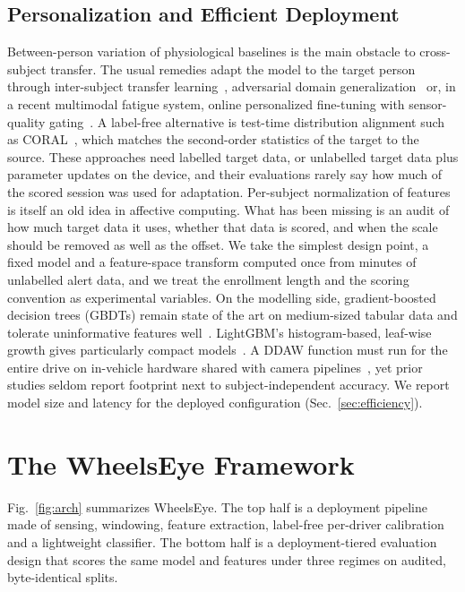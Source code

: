\documentclass[journal]{IEEEtran}
\newcommand{\sysname}{WheelsEye}
\begin{document}
\subsection{Personalization and Efficient Deployment}
Between-person variation of physiological baselines is the main obstacle to
cross-subject transfer. The usual remedies adapt the model to the target
person through inter-subject transfer learning~\cite{liu2020intersubject},
adversarial domain generalization~\cite{ma2019depersonalized} or, in a recent
multimodal fatigue system, online personalized fine-tuning with sensor-quality
gating~\cite{aravinth2025dynamic}. A label-free alternative is test-time
distribution alignment such as CORAL~\cite{sun2016coral}, which matches the
second-order statistics of the target to the source. These approaches need
labelled target data, or unlabelled target data plus parameter updates on the
device, and their evaluations rarely say how much of the scored session was
used for adaptation. Per-subject normalization of features is itself an old
idea in affective computing. What has been missing is an audit of how much
target data it uses, whether that data is scored, and when the scale should be
removed as well as the offset. We take the simplest design point, a fixed
model and a feature-space transform computed once from minutes of unlabelled
alert data, and we treat the enrollment length and the scoring convention as
experimental variables. On the modelling side, gradient-boosted decision trees
(GBDTs) remain state of the art on medium-sized tabular data and tolerate
uninformative features well~\cite{grinsztajn2022tree,shwartz2022tabular}.
LightGBM's histogram-based, leaf-wise growth gives particularly compact
models~\cite{ke2017lightgbm}. A DDAW function must run for the entire drive
on in-vehicle hardware shared with camera pipelines~\cite{eu2021ddaw}, yet
prior studies seldom report footprint next to subject-independent accuracy. We
report model size and latency for the deployed configuration
(Sec.~\ref{sec:efficiency}).

\section{The \sysname{} Framework}
Fig.~\ref{fig:arch} summarizes \sysname. The top half is a deployment
pipeline made of sensing, windowing, feature extraction, label-free per-driver
calibration and a lightweight classifier. The bottom half is a
deployment-tiered evaluation design that scores the same model and features
under three regimes on audited, byte-identical splits.
\end{document}
